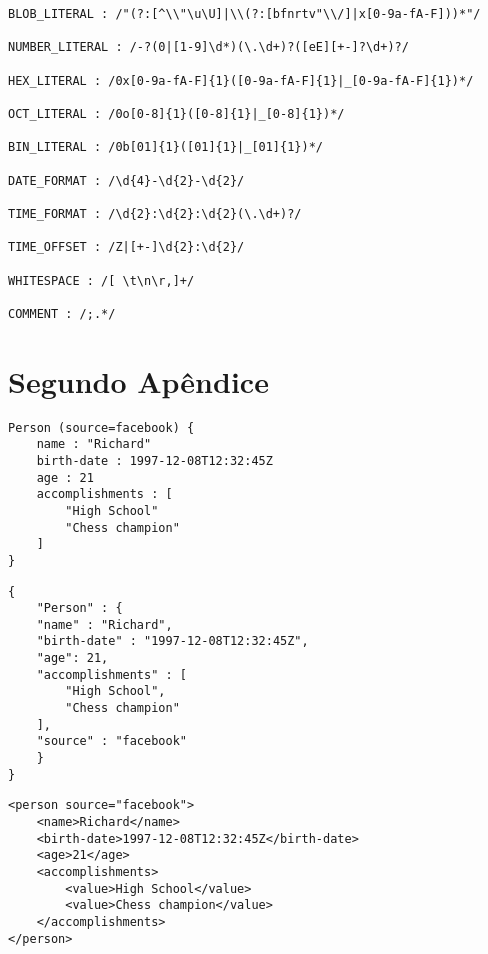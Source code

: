 \begin{apendicesenv}
\begin{lstlisting}[caption=Gramática do FRED,label={lst:fredgrammar}]
BLOB_LITERAL : /"(?:[^\\"\u\U]|\\(?:[bfnrtv"\\/]|x[0-9a-fA-F]))*"/

NUMBER_LITERAL : /-?(0|[1-9]\d*)(\.\d+)?([eE][+-]?\d+)?/

HEX_LITERAL : /0x[0-9a-fA-F]{1}([0-9a-fA-F]{1}|_[0-9a-fA-F]{1})*/

OCT_LITERAL : /0o[0-8]{1}([0-8]{1}|_[0-8]{1})*/

BIN_LITERAL : /0b[01]{1}([01]{1}|_[01]{1})*/

DATE_FORMAT : /\d{4}-\d{2}-\d{2}/

TIME_FORMAT : /\d{2}:\d{2}:\d{2}(\.\d+)?/

TIME_OFFSET : /Z|[+-]\d{2}:\d{2}/

WHITESPACE : /[ \t\n\r,]+/

COMMENT : /;.*/
\end{lstlisting}

\chapter{Segundo Apêndice}
\label{sec:docsexamples}


\begin{lstlisting}[caption=Exemplo de documento FRED,label={lst:freddoc1}]
Person (source=facebook) {
    name : "Richard"
    birth-date : 1997-12-08T12:32:45Z
    age : 21
    accomplishments : [
        "High School"
        "Chess champion"
    ]
}
\end{lstlisting}

\begin{lstlisting}[caption=Exemplo de documento JSON,label={lst:jsondoc1}]
{ 
    "Person" : {
    "name" : "Richard",
    "birth-date" : "1997-12-08T12:32:45Z",
    "age": 21,
    "accomplishments" : [
        "High School",
        "Chess champion"
    ],
    "source" : "facebook"
    }
}
\end{lstlisting}

\begin{lstlisting}[caption=Exemplo de documento XML,label={lst:xmldoc1}]
<person source="facebook">
    <name>Richard</name>
    <birth-date>1997-12-08T12:32:45Z</birth-date>
    <age>21</age>
    <accomplishments>
        <value>High School</value>
        <value>Chess champion</value>
    </accomplishments>
</person>
\end{lstlisting}

\end{apendicesenv}
